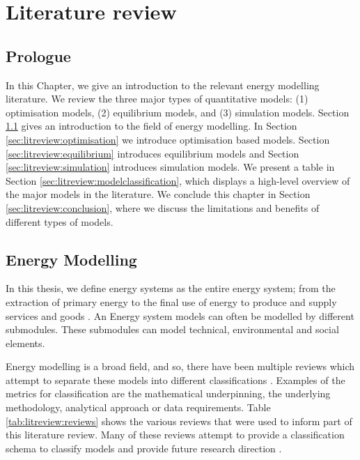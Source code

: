 \chapter{Literature review}
\label{chapter:litreview}
\ifpdf
\graphicspath{{Chapter3/Figs/Raster/}{Chapter3/Figs/PDF/}{Chapter3/Figs/}}
\else
\graphicspath{{Chapter3/Figs/Vector/}{Chapter3/Figs/}}
\fi

\section*{Prologue}

In this Chapter, we give an introduction to the relevant energy modelling literature. We review the three major types of quantitative models: (1) optimisation models, (2) equilibrium models, and (3) simulation models. Section \ref{sec:litreview:energymodelling} gives an introduction to the field of energy modelling. In Section \ref{sec:litreview:optimisation} we introduce optimisation based models. Section \ref{sec:litreview:equilibrium} introduces equilibrium models and Section \ref{sec:litreview:simulation} introduces simulation models. We present a table in Section \ref{sec:litreview:modelclassification}, which displays a high-level overview of the major models in the literature. We conclude this chapter in Section \ref{sec:litreview:conclusion}, where we discuss the limitations and benefits of different types of models.

\section{Energy Modelling}
\label{sec:litreview:energymodelling}


In this thesis, we define energy systems as the entire energy system; from the extraction of primary energy to the final use of energy to produce and supply services and goods \cite{Pfenninger2014b}. An Energy system models can often be modelled by different submodules. These submodules can model technical, environmental and social elements.


Energy modelling is a broad field, and so, there have been multiple reviews which attempt to separate these models into different classifications \cite{Savvidis2019a, Sensfub2007,Ringkjob2018}. Examples of the metrics for classification are the mathematical underpinning, the underlying methodology, analytical approach or data requirements. Table \ref{tab:litreview:reviews} shows the various reviews that were used to inform part of this literature review. Many of these reviews attempt to provide a classification schema to classify models \cite{Hall2016a, Savvidis2019a} and provide future research direction \cite{Pfenninger2014b,Savvidis2019a}. 



